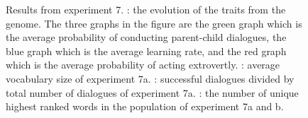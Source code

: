 \begin{figure}
    \centering
    \ContinuedFloat
    \hfill
    \par \bigskip
    \hfill
    \caption{Results from experiment 7. : the evolution of the traits from the genome. The three graphs in the figure are the green graph which is the average probability of conducting parent-child dialogues, the blue graph which is the average learning rate, and the  red graph which is the average probability of acting extrovertly. : average vocabulary size of experiment 7a. : successful dialogues divided by total number of dialogues of experiment 7a. : the number of unique highest ranked words in the population of experiment 7a and b.}
    \label{fig:exp7.1}
\end{figure}